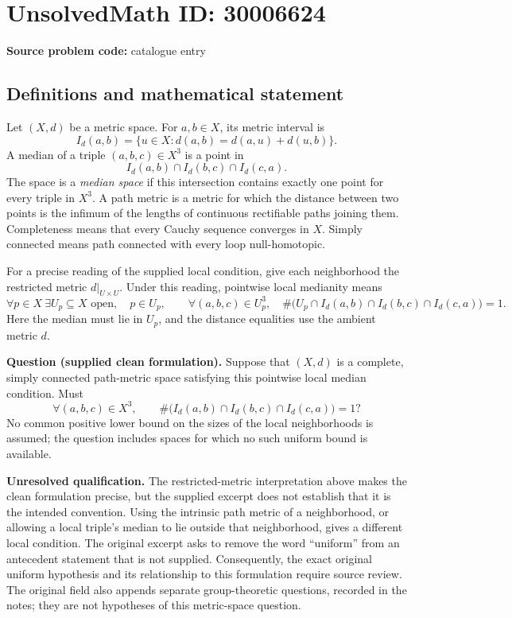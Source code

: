 \documentclass[11pt]{article}
\begin{document}
\section*{UnsolvedMath ID: 30006624}
\textbf{Source problem code:} catalogue entry
\subsection{Definitions and mathematical statement}
Let \((X,d)\) be a metric space. For \(a,b\in X\), its metric interval is
\[
I_d(a,b)=\{u\in X:d(a,b)=d(a,u)+d(u,b)\}.
\]
A median of a triple \((a,b,c)\in X^3\) is a point in
\[
I_d(a,b)\cap I_d(b,c)\cap I_d(c,a).
\]
The space is a \emph{median space} if this intersection contains exactly one point for every triple in \(X^3\). A path metric is a metric for which the distance between two points is the infimum of the lengths of continuous rectifiable paths joining them. Completeness means that every Cauchy sequence converges in \(X\). Simply connected means path connected with every loop null-homotopic.

For a precise reading of the supplied local condition, give each neighborhood the restricted metric \(d|_{U\times U}\). Under this reading, pointwise local medianity means
\[
\forall p\in X\ \exists U_p\subseteq X\text{ open},\quad p\in U_p,\qquad
\forall(a,b,c)\in U_p^3,\quad
\#\bigl(U_p\cap I_d(a,b)\cap I_d(b,c)\cap I_d(c,a)\bigr)=1.
\]
Here the median must lie in \(U_p\), and the distance equalities use the ambient metric \(d\).

\textbf{Question (supplied clean formulation).} Suppose that \((X,d)\) is a complete, simply connected path-metric space satisfying this pointwise local median condition. Must
\[
\forall(a,b,c)\in X^3,\qquad
\#\bigl(I_d(a,b)\cap I_d(b,c)\cap I_d(c,a)\bigr)=1?
\]
No common positive lower bound on the sizes of the local neighborhoods is assumed; the question includes spaces for which no such uniform bound is available.

\textbf{Unresolved qualification.} The restricted-metric interpretation above makes the clean formulation precise, but the supplied excerpt does not establish that it is the intended convention. Using the intrinsic path metric of a neighborhood, or allowing a local triple's median to lie outside that neighborhood, gives a different local condition. The original excerpt asks to remove the word ``uniform'' from an antecedent statement that is not supplied. Consequently, the exact original uniform hypothesis and its relationship to this formulation require source review. The original field also appends separate group-theoretic questions, recorded in the notes; they are not hypotheses of this metric-space question.
\end{document}

